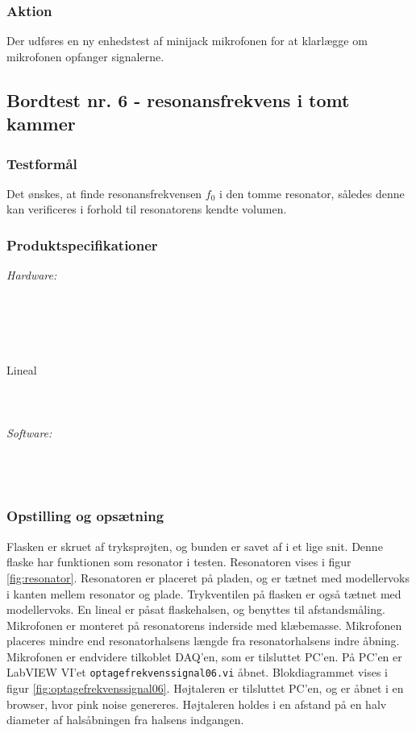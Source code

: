 			\subsubsection{Aktion}
			 Der udføres en ny enhedstest af minijack mikrofonen for at klarlægge om mikrofonen opfanger signalerne. 
			 
	\subsection{	Bordtest nr. 6 - resonansfrekvens i tomt kammer}
	
	\subsubsection{Testformål}
	Det ønskes, at finde resonansfrekvensen $f_{0}$ i den tomme resonator, således denne kan verificeres i forhold til resonatorens kendte volumen.  	
	
	\subsubsection{Produktspecifikationer}
	\textit{Hardware:}\\
	\\
	\elektretto\\
	\daq\\
	\\	
	\snot\\	
	Lineal\\
	\modellervoks\\
	\plade\\
	\PC\\
	
	\textit{Software:}\\
	\labview\\
	\daqsoft\\
	\onlineg\\
	
	\subsubsection{Opstilling og opsætning}
	Flasken er skruet af tryksprøjten, og bunden er savet af i et lige snit. Denne flaske har funktionen som resonator i testen. Resonatoren vises i figur \ref{fig:resonator}. Resonatoren er placeret på pladen, og er tætnet med modellervoks i kanten mellem resonator og plade. Trykventilen på flasken er også tætnet med modellervoks. En lineal er påsat flaskehalsen, og benyttes til afstandsmåling. Mikrofonen er monteret på resonatorens inderside med klæbemasse. Mikrofonen placeres mindre end resonatorhalsens længde fra  resonatorhalsens indre åbning. Mikrofonen er endvidere tilkoblet DAQ'en, som er tilsluttet PC'en. På PC'en er LabVIEW VI'et \texttt{optagefrekvenssignal06.vi} åbnet. Blokdiagrammet vises i figur \ref{fig:optagefrekvenssignal06}. Højtaleren er tilsluttet PC'en, og \onlineg er åbnet i en browser, hvor pink noise genereres. Højtaleren holdes i en afstand på en halv diameter af halsåbningen fra halsens indgangen.  
	
